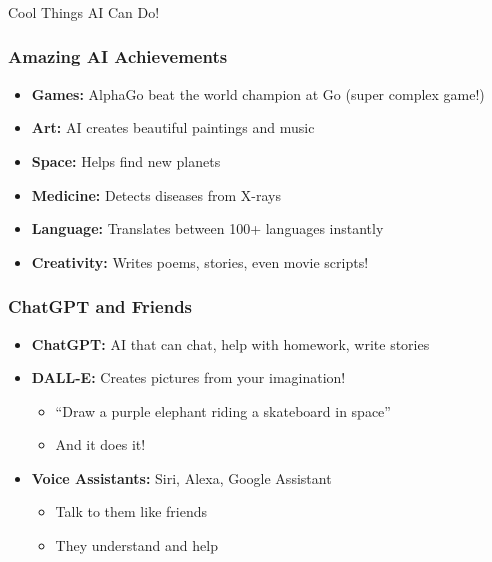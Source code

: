 \begin{frame}[fragile]\frametitle{}
\begin{center}
{\Large Cool Things AI Can Do!}
\end{center}
\end{frame}

\begin{frame}[fragile]\frametitle{Amazing AI Achievements}
\begin{itemize}
\item {\bf Games:} AlphaGo beat the world champion at Go (super complex game!)
\item {\bf Art:} AI creates beautiful paintings and music
\item {\bf Space:} Helps find new planets
\item {\bf Medicine:} Detects diseases from X-rays
\item {\bf Language:} Translates between 100+ languages instantly
\item {\bf Creativity:} Writes poems, stories, even movie scripts!
\end{itemize}
\end{frame}

\begin{frame}[fragile]\frametitle{ChatGPT and Friends}
\begin{itemize}
\item {\bf ChatGPT:} AI that can chat, help with homework, write stories
\item {\bf DALL-E:} Creates pictures from your imagination!
\begin{itemize}
\item ``Draw a purple elephant riding a skateboard in space''
\item And it does it!
\end{itemize}
\item {\bf Voice Assistants:} Siri, Alexa, Google Assistant
\begin{itemize}
\item Talk to them like friends
\item They understand and help
\end{itemize}
\end{itemize}
\end{frame}

